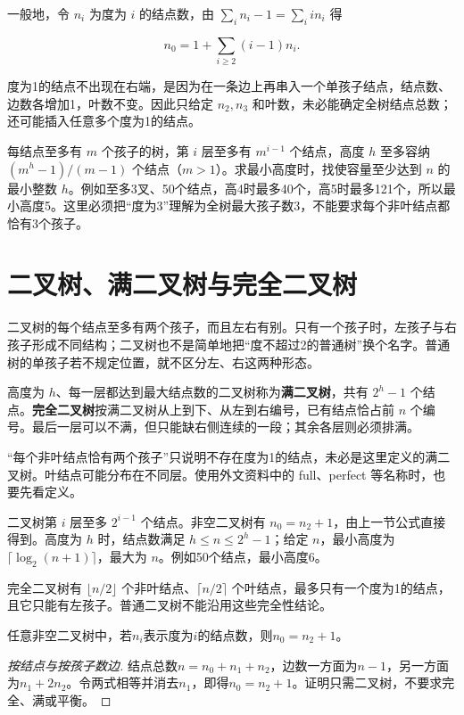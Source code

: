 一般地，令 \(n_i\) 为度为 \(i\) 的结点数，由 \(\sum_i n_i-1=\sum_i i n_i\) 得

\[n_0=1+\sum_{i\ge2}(i-1)n_i.\]

度为1的结点不出现在右端，是因为在一条边上再串入一个单孩子结点，结点数、边数各增加1，叶数不变。因此只给定 \(n_2,n_3\) 和叶数，未必能确定全树结点总数；还可能插入任意多个度为1的结点。

每结点至多有 \(m\) 个孩子的树，第 \(i\) 层至多有 \(m^{i-1}\) 个结点，高度 \(h\) 至多容纳 \((m^h-1)/(m-1)\) 个结点（\(m>1\)）。求最小高度时，找使容量至少达到 \(n\) 的最小整数 \(h\)。例如至多3叉、50个结点，高4时最多40个，高5时最多121个，所以最小高度5。这里必须把``度为3''理解为全树最大孩子数3，不能要求每个非叶结点都恰有3个孩子。

\section{二叉树、满二叉树与完全二叉树}\label{DS05-02}

二叉树的每个结点至多有两个孩子，而且左右有别。只有一个孩子时，左孩子与右孩子形成不同结构；二叉树也不是简单地把``度不超过2的普通树''换个名字。普通树的单孩子若不规定位置，就不区分左、右这两种形态。

高度为 \(h\)、每一层都达到最大结点数的二叉树称为\textbf{满二叉树}，共有 \(2^h-1\) 个结点。\textbf{完全二叉树}按满二叉树从上到下、从左到右编号，已有结点恰占前 \(n\) 个编号。最后一层可以不满，但只能缺右侧连续的一段；其余各层则必须排满。

``每个非叶结点恰有两个孩子''只说明不存在度为1的结点，未必是这里定义的满二叉树。叶结点可能分布在不同层。使用外文资料中的 full、perfect 等名称时，也要先看定义。

二叉树第 \(i\) 层至多 \(2^{i-1}\) 个结点。非空二叉树有 \(n_0=n_2+1\)，由上一节公式直接得到。高度为 \(h\) 时，结点数满足 \(h\le n\le2^h-1\)；给定 \(n\)，最小高度为 \(\lceil\log_2(n+1)\rceil\)，最大为 \(n\)。例如50个结点，最小高度6。

完全二叉树有 \(\lfloor n/2\rfloor\) 个非叶结点、\(\lceil n/2\rceil\) 个叶结点，最多只有一个度为1的结点，且它只能有左孩子。普通二叉树不能沿用这些完全性结论。

\begin{theorem}[二叉树的叶与双孩子结点]

任意非空二叉树中，若\(n_i\)表示度为\(i\)的结点数，则\(n_0=n_2+1\)。

\end{theorem}

\begin{proof}[按结点与按孩子数边]

结点总数\(n=n_0+n_1+n_2\)，边数一方面为\(n-1\)，另一方面为\(n_1+2n_2\)。令两式相等并消去\(n_1\)，即得\(n_0=n_2+1\)。证明只需二叉树，不要求完全、满或平衡。

\end{proof}

